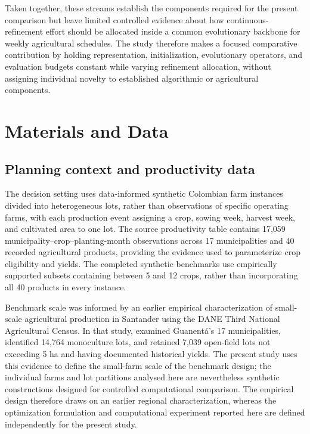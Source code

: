 \documentclass[]{interact}
\begin{document}
Taken together, these streams establish the components required for the present comparison but leave limited controlled evidence about how continuous-refinement effort should be allocated inside a common evolutionary backbone for weekly agricultural schedules. The study therefore makes a focused comparative contribution by holding representation, initialization, evolutionary operators, and evaluation budgets constant while varying refinement allocation, without assigning individual novelty to established algorithmic or agricultural components.

\section{Materials and Data}

\subsection{Planning context and productivity data}

The decision setting uses data-informed synthetic Colombian farm instances divided into heterogeneous lots, rather than observations of specific operating farms, with each production event assigning a crop, sowing week, harvest week, and cultivated area to one lot. The source productivity table contains 17,059 municipality--crop--planting-month observations across 17 municipalities and 40 recorded agricultural products, providing the evidence used to parameterize crop eligibility and yields. The completed synthetic benchmarks use empirically supported subsets containing between 5 and 12 crops, rather than incorporating all 40 products in every instance.

Benchmark scale was informed by an earlier empirical characterization of small-scale agricultural production in Santander using the DANE Third National Agricultural Census. In that study, \citet{Talero2018} examined Guanent\'a's 17 municipalities, identified 14,764 monoculture lots, and retained 7,039 open-field lots not exceeding 5 ha and having documented historical yields. The present study uses this evidence to define the small-farm scale of the benchmark design; the individual farms and lot partitions analysed here are nevertheless synthetic constructions designed for controlled computational comparison. The empirical design therefore draws on an earlier regional characterization, whereas the optimization formulation and computational experiment reported here are defined independently for the present study.
\end{document}
